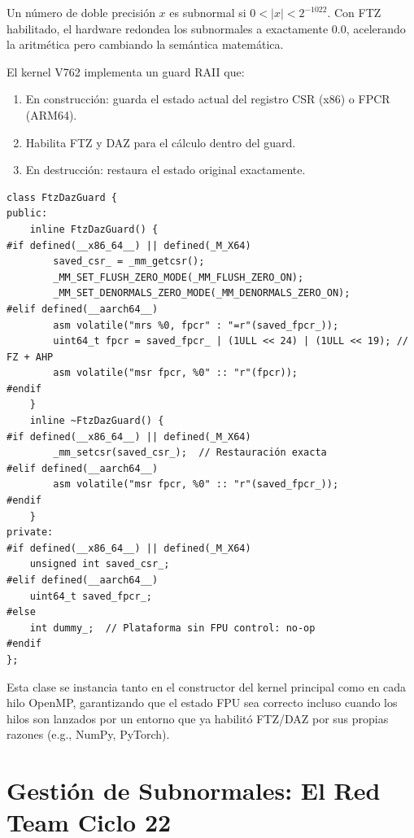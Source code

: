 \begin{definition}
Un número de doble precisión $x$ es subnormal si $0 < |x| < 2^{-1022}$.
Con FTZ habilitado, el hardware redondea los subnormales a exactamente $0.0$,
acelerando la aritmética pero cambiando la semántica matemática.
\end{definition}

El kernel V762 implementa un guard RAII que:
\begin{enumerate}
\item En construcción: guarda el estado actual del registro CSR (x86) o FPCR (ARM64).
\item Habilita FTZ y DAZ para el cálculo dentro del guard.
\item En destrucción: restaura el estado original exactamente.
\end{enumerate}

\begin{lstlisting}[style=cppstyle, caption={FtzDazGuard RAII --- Multi-Plataforma}, label=lst:ftzdaz]
class FtzDazGuard {
public:
    inline FtzDazGuard() {
#if defined(__x86_64__) || defined(_M_X64)
        saved_csr_ = _mm_getcsr();
        _MM_SET_FLUSH_ZERO_MODE(_MM_FLUSH_ZERO_ON);
        _MM_SET_DENORMALS_ZERO_MODE(_MM_DENORMALS_ZERO_ON);
#elif defined(__aarch64__)
        asm volatile("mrs %0, fpcr" : "=r"(saved_fpcr_));
        uint64_t fpcr = saved_fpcr_ | (1ULL << 24) | (1ULL << 19); // FZ + AHP
        asm volatile("msr fpcr, %0" :: "r"(fpcr));
#endif
    }
    inline ~FtzDazGuard() {
#if defined(__x86_64__) || defined(_M_X64)
        _mm_setcsr(saved_csr_);  // Restauración exacta
#elif defined(__aarch64__)
        asm volatile("msr fpcr, %0" :: "r"(saved_fpcr_));
#endif
    }
private:
#if defined(__x86_64__) || defined(_M_X64)
    unsigned int saved_csr_;
#elif defined(__aarch64__)
    uint64_t saved_fpcr_;
#else
    int dummy_;  // Plataforma sin FPU control: no-op
#endif
};
\end{lstlisting}

Esta clase se instancia tanto en el constructor del kernel principal como
en cada hilo OpenMP, garantizando que el estado FPU sea correcto incluso
cuando los hilos son lanzados por un entorno que ya habilitó FTZ/DAZ por
sus propias razones (e.g., NumPy, PyTorch).

\section{Gestión de Subnormales: El Red Team Ciclo 22}

